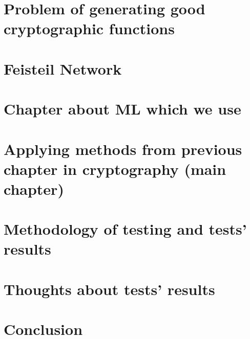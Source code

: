 \documentclass{article}
\begin{document}
\section{Problem of generating good cryptographic functions}

\section{Feisteil Network}

\section{Chapter about ML which we use}

\section{Applying methods from previous chapter in cryptography (main chapter)}

\section{Methodology of testing and tests' results}

\section{Thoughts about tests' results}

\section{Conclusion}




\end{document}
